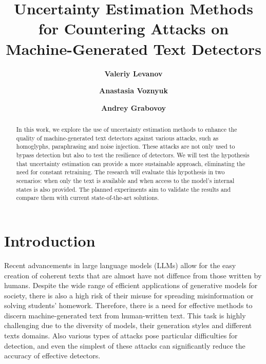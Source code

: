 \documentclass[a4paper, 12pt]{article}
\title{Uncertainty Estimation Methods for Countering Attacks on Machine-Generated Text Detectors}
\author[1]{\textbf{Valeriy Levanov}}
\author[1]{\textbf{Anastasia Voznyuk}}
\author[1]{\textbf{Andrey Grabovoy}}
\affil[1]{\texttt{Moscow Institute of Physics and Technology, Moscow}}
\begin{document}
\maketitle



\begin{abstract}
	In this work, we explore the use of uncertainty estimation methods to enhance the quality of machine-generated text detectors against various attacks, such as homoglyphs, paraphrasing and noise injection. These attacks are not only used to bypass detection but also to test the resilience of detectors. We will test the hypothesis that uncertainty estimation can provide a more sustainable approach, eliminating the need for constant retraining. The research will evaluate this hypothesis in two scenarios: when only the text is available and when access to the model's internal states is also provided. The planned experiments aim to validate the results and compare them with current state-of-the-art solutions.
\end{abstract}

\section{Introduction}
Recent advancements in large language models (LLMs) allow for the easy creation of coherent texts that are almost have not diffence from those written by humans. Despite the wide range of efficient applications of generative models for society, there is also a high risk of their misuse for spreading misinformation or solving students' homework. Therefore, there is a need for effective methods to discern machine-generated text from human-written text. This task is highly challenging due to the diversity of models, their generation styles and different texts domains. Also various types of attacks pose particular difficulties for detection, and even the simplest of these attacks can significantly reduce the accuracy of effective detectors.
\end{document}
